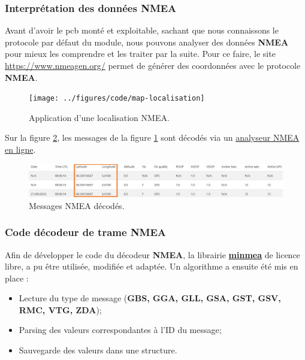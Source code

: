 \subsubsection{Interprétation des données NMEA}
Avant d'avoir le \gls{pcb} monté et exploitable, sachant que nous connaissons le protocole par défaut du module, nous pouvons analyser des données \textbf{NMEA} pour mieux les comprendre et les traiter par la suite. Pour ce faire, le site \href{https://www.nmeagen.org/}{https://www.nmeagen.org/} permet de générer des coordonnées avec le protocole \textbf{NMEA}.

\begin{figure}[h]
	\centering
	\texttt{[image: ../figures/code/map-localisation]}
	\caption{Application d'une localisation NMEA.}
	\label{fig:map-localisation}
\end{figure}

Sur la figure \ref{fig:parsed-nmea}, les messages de la figure \ref{fig:map-localisation} sont décodés via un \href{https://swairlearn.bluecover.pt/nmea_analyser}{analyseur NMEA en ligne}.

\begin{figure}[h]
	\centering
	\includegraphics[width=0.8\linewidth]{../figures/code/parsed-nmea}
	\caption{Messages NMEA décodés.}
	\label{fig:parsed-nmea}
\end{figure}

\clearpage

\subsubsection{Code décodeur de trame NMEA}
Afin de développer le code du décodeur \textbf{NMEA}, la librairie \href{https://github.com/kosma/minmea}{\textbf{minmea}} de licence libre, a pu être utilisée, modifiée et adaptée. Un algorithme a ensuite été mis en place :

\begin{itemize}
	\item[\oldstylenums{1}] Lecture du type de message (\textbf{GBS, GGA, GLL, GSA, GST, GSV, RMC, VTG, ZDA});
	\item[\oldstylenums{2}] Parsing des valeurs correspondantes à l'ID du message;
	\item[\oldstylenums{3}] Sauvegarde des valeurs dans une structure.
\end{itemize}


